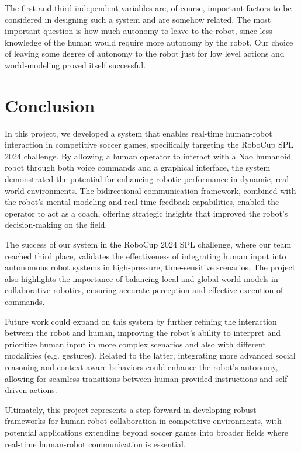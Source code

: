 \documentclass[a4paper, onecolumn, 12pt]{article}
\begin{document}
The first and third independent variables are, of course, important factors to be considered in designing such a system and are somehow related. The most important question is how much autonomy to leave to the robot, since less knowledge of the human would require more autonomy by the robot. Our choice of leaving some degree of autonomy to the robot just for low level actions and world-modeling proved itself successful.

\section{Conclusion}
\label{sec:con}

In this project, we developed a system that enables real-time human-robot interaction in competitive soccer games, specifically targeting the RoboCup SPL 2024 challenge. By allowing a human operator to interact with a Nao humanoid robot through both voice commands and a graphical interface, the system demonstrated the potential for enhancing robotic performance in dynamic, real-world environments. The bidirectional communication framework, combined with the robot's mental modeling and real-time feedback capabilities, enabled the operator to act as a coach, offering strategic insights that improved the robot's decision-making on the field.

The success of our system in the RoboCup 2024 SPL challenge, where our team reached third place, validates the effectiveness of integrating human input into autonomous robot systems in high-pressure, time-sensitive scenarios. The project also highlights the importance of balancing local and global world models in collaborative robotics, ensuring accurate perception and effective execution of commands.

Future work could expand on this system by further refining the interaction between the robot and human, improving the robot's ability to interpret and prioritize human input in more complex scenarios and also with different modalities (e.g. gestures). Related to the latter, integrating more advanced social reasoning and context-aware behaviors could enhance the robot's autonomy, allowing for seamless transitions between human-provided instructions and self-driven actions.

Ultimately, this project represents a step forward in developing robust frameworks for human-robot collaboration in competitive environments, with potential applications extending beyond soccer games into broader fields where real-time human-robot communication is essential.




\end{document}
